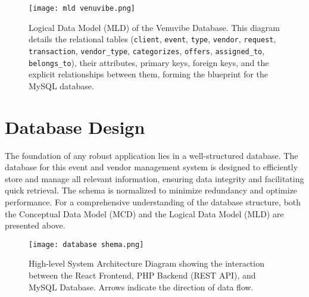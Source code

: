 \documentclass{report}
\begin{document}
\begin{figure}[htbp]
    \centering
    \texttt{[image: mld venuvibe.png]} %
    \caption{Logical Data Model (MLD) of the Venuvibe Database. This diagram details the relational tables (\texttt{client}, \texttt{event}, \texttt{type}, \texttt{vendor}, \texttt{request}, \texttt{transaction}, \texttt{vendor\_type}, \texttt{categorizes}, \texttt{offers}, \texttt{assigned\_to}, \texttt{belongs\_to}), their attributes, primary keys, foreign keys, and the explicit relationships between them, forming the blueprint for the MySQL database.}
    \label{fig:mld_diagram}
\end{figure}

\section{Database Design}
\label{sec:database_design}
The foundation of any robust application lies in a well-structured database. The database for this event and vendor management system is designed to efficiently store and manage all relevant information, ensuring data integrity and facilitating quick retrieval. The schema is normalized to minimize redundancy and optimize performance. For a comprehensive understanding of the database structure, both the Conceptual Data Model (MCD) and the Logical Data Model (MLD) are presented above.

\begin{figure}[htbp]
    \centering
    \texttt{[image: database shema.png]} %
    \caption{High-level System Architecture Diagram showing the interaction between the React Frontend, PHP Backend (REST API), and MySQL Database. Arrows indicate the direction of data flow.}
    \label{fig:system_architecture_diagram}
\end{figure}
\end{document}
